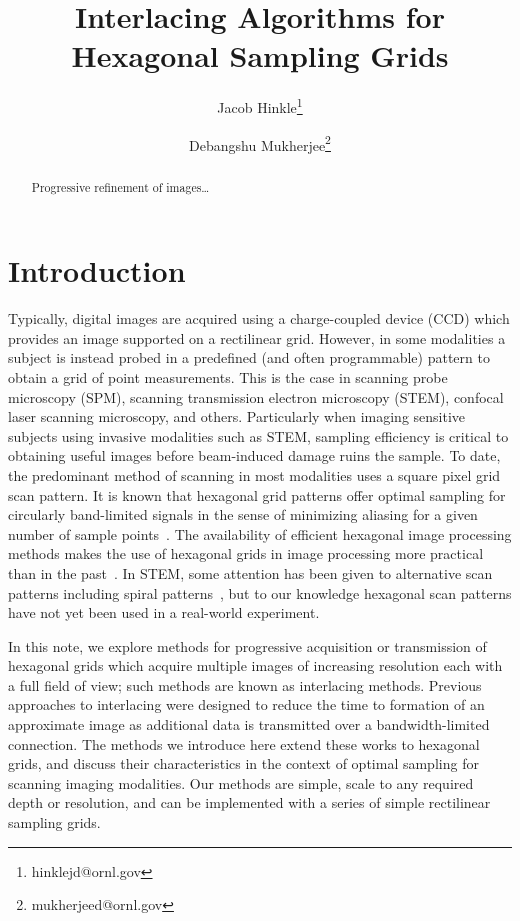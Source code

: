\documentclass{article}
\title{Interlacing Algorithms for Hexagonal Sampling Grids}
\author{Jacob Hinkle\thanks{hinklejd@ornl.gov} }
\author{Debangshu Mukherjee\thanks{mukherjeed@ornl.gov} }
\affil{
	Oak Ridge National Laboratory
}
\begin{document}
\maketitle
\begin{abstract}
Progressive refinement of images\ldots{}
\end{abstract}

\section{Introduction}
\label{sec:intro}

Typically, digital images are acquired using a charge-coupled device (CCD) which provides an image supported on a rectilinear grid.
%
However, in some modalities a subject is instead probed in a predefined (and often programmable) pattern to obtain a grid of point measurements.
%
This is the case in scanning probe microscopy (SPM), scanning transmission electron microscopy (STEM), confocal laser scanning microscopy, and others.
%
Particularly when imaging sensitive subjects using invasive modalities such as STEM, sampling efficiency is critical to obtaining useful images before beam-induced damage ruins the sample.
%
To date, the predominant method of scanning in most modalities uses a square pixel grid scan pattern.
%
It is known that hexagonal grid patterns offer optimal sampling for circularly band-limited signals in the sense of minimizing aliasing for a given number of sample points~\citep{petersen1962}.
%
The availability of efficient hexagonal image processing methods makes the use of hexagonal grids in image processing more practical than in the past~\citep{birdsong2016hexfft,middleton2006hexagonal}.
%
In STEM, some attention has been given to alternative scan patterns including spiral patterns~\citep{sang2016dynamic}, but to our knowledge hexagonal scan patterns have not yet been used in a real-world experiment.


In this note, we explore methods for progressive acquisition or transmission of hexagonal grids which acquire multiple images of increasing resolution each with a full field of view; such methods are known as interlacing methods.
%
Previous approaches to interlacing were designed to reduce the time to formation of an approximate image as additional data is transmitted over a bandwidth-limited connection.
%
The methods we introduce here extend these works to hexagonal grids, and discuss their characteristics in the context of optimal sampling for scanning imaging modalities.
%
Our methods are simple, scale to any required depth or resolution, and can be
implemented with a series of simple rectilinear sampling grids.
\end{document}
